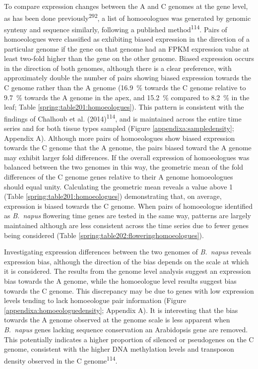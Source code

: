 \documentclass[12pt,]{book}
\begin{document}
To compare expression changes between the A and C genomes at the gene
level, as has been done previously\textsuperscript{292}, a list of
homoeologues was generated by genomic synteny and sequence similarly,
following a published method\textsuperscript{114}. Pairs of homoeologues
were classified as exhibiting biased expression in the direction of a
particular genome if the gene on that genome had an FPKM expression
value at least two-fold higher than the gene on the other genome. Biased
expression occurs in the direction of both genomes, although there is a
clear preference, with approximately double the number of pairs showing
biased expression towards the C genome rather than the A genome (16.9~\%
towards the C genome relative to 9.7~\% towards the A genome in the
apex, and 15.2~\% compared to 8.2~\% in the leaf; Table
\ref{spring:table201:homoeologues}). This pattern is consistent with the
findings of Chalhoub et al. (2014)\textsuperscript{114}, and is
maintained across the entire time series and for both tissue types
sampled (Figure \ref{appendixa:sampledensity}; Appendix A). Although
more pairs of homoeologues show biased expression towards the C genome
that the A genome, the pairs biased toward the A genome may exhibit
larger fold differences. If the overall expression of homoeologues was
balanced between the two genomes in this way, the geometric mean of the
fold differences of the C genome genes relative to their A genome
homoeologues should equal unity. Calculating the geometric mean reveals
a value above 1 (Table \ref{spring:table201:homoeologues}) demonstrating
that, on average, expression is biased towards the C genome. When pairs
of homoeologue identified as \emph{B.~napus} flowering time genes are
tested in the same way, patterns are largely maintained although are
less consistent across the time series due to fewer genes being
considered (Table \ref{spring:table202:floweringhomoeologues}).

Investigating expression differences between the two genomes of
\emph{B.~napus} reveals expression bias, although the direction of the
bias depends on the scale at which it is considered. The results from
the genome level analysis suggest an expression bias towards the A
genome, while the homoeologue level results suggest bias towards the C
genome. This discrepancy may be due to genes with low expression levels
tending to lack homoeologue pair information (Figure
\ref{appendixa:homoeologuedensity}; Appendix A). It is interesting that
the bias towards the A genome observed at the genome scale is less
apparent when \emph{B.~napus} genes lacking sequence conservation an
Arabidopsis gene are removed. This potentially indicates a higher
proportion of silenced or pseudogenes on the C genome, consistent with
the higher DNA methylation levels and transposon density observed in the
C genome\textsuperscript{114}.
\end{document}
